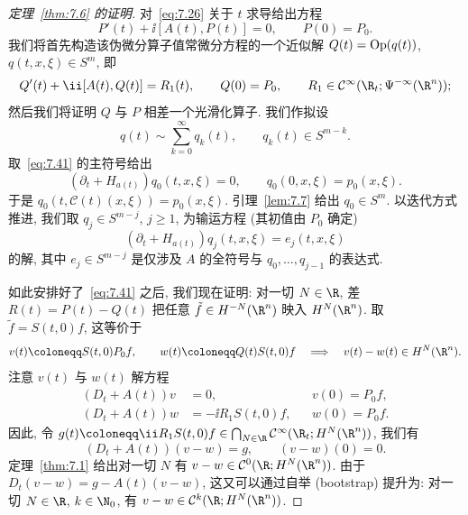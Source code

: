 \begin{proof}[定理~\ref{thm:7.6} 的证明]
对~\eqref{eq:7.26} 关于 $t$ 求导给出方程
\begin{equation}\label{eq:7.40}
    P'(t) + \ii [A(t), P(t)] = 0, \qquad P(0) = P_0.
\end{equation}
我们将首先构造该伪微分算子值常微分方程的一个近似解 $Q(t) = \operatorname{Op}(q(t))$, $q(t, x, \xi) \in S^m$, 即
\begin{equation}\label{eq:7.41}
    Q'(t) + \ii [A(t), Q(t)] = R_1(t), \qquad Q(0) = P_0, \qquad R_1 \in \Smooth(\R_t; \Psi^{-\infty}(\R^n));
\end{equation}
然后我们将证明 $Q$ 与 $P$ 相差一个光滑化算子. 我们作拟设
\begin{equation}\label{eq:7.42}
    q(t) \sim \sum_{k=0}^\infty q_k(t), \qquad q_k(t) \in S^{m-k}.
\end{equation}
取~\eqref{eq:7.41} 的主符号给出
\begin{equation}\label{eq:7.43}
    (\partial_t + H_{a(t)}) q_0(t, x, \xi) = 0, \qquad q_0(0, x, \xi) = p_0(x, \xi).
\end{equation}
于是 $q_0(t, \mathcal{C}(t)(x, \xi)) = p_0(x, \xi)$. 引理~\ref{lem:7.7} 给出 $q_0 \in S^m$. 以迭代方式推进, 我们取 $q_j \in S^{m-j}$, $j \ge 1$, 为输运方程 (其初值由 $P_0$ 确定)
\begin{equation}\label{eq:7.44}
    (\partial_t + H_{a(t)}) q_j(t, x, \xi) = e_j(t, x, \xi)
\end{equation}
的解, 其中 $e_j \in S^{m-j}$ 是仅涉及 $A$ 的全符号与 $q_0, \ldots, q_{j-1}$ 的表达式.

如此安排好了~\eqref{eq:7.41} 之后, 我们现在证明: 对一切 $N \in \R$, 差 $R(t) = P(t) - Q(t)$ 把任意 $\tilde{f} \in H^{-N}(\R^n)$ 映入 $H^N(\R^n)$. 取 $\tilde{f} = S(t, 0)f$, 这等价于
\begin{equation}\label{eq:7.45}
    v(t) \defeq S(t, 0)P_0 f, \qquad w(t) \defeq Q(t)S(t, 0)f \quad \Longrightarrow \quad v(t) - w(t) \in H^N(\R^n).
\end{equation}
注意 $v(t)$ 与 $w(t)$ 解方程
\begin{equation}\label{eq:7.46}
    \begin{aligned}
        (D_t + A(t)) v &= 0, && v(0) = P_0 f, \\
        (D_t + A(t)) w &= -\ii R_1 S(t, 0) f, && w(0) = P_0 f.
    \end{aligned}
\end{equation}
因此, 令 $g(t) \defeq \ii R_1 S(t, 0) f \in \bigcap_{N \in \R} \Smooth(\R_t; H^N(\R^n))$, 我们有
\begin{equation}\label{eq:7.47}
    (D_t + A(t))(v - w) = g, \qquad (v - w)(0) = 0.
\end{equation}
定理~\ref{thm:7.1} 给出对一切 $N$ 有 $v - w \in \mathcal{C}^0(\R; H^N(\R^n))$. 由于 $D_t(v - w) = g - A(t)(v - w)$, 这又可以通过自举 (bootstrap) 提升为: 对一切 $N \in \R$, $k \in \N_0$, 有 $v - w \in \mathcal{C}^k(\R; H^N(\R^n))$.
\end{proof}

